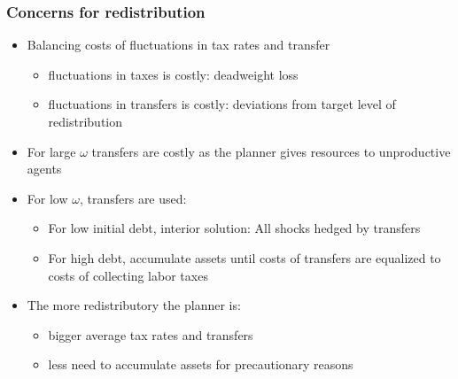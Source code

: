 \documentclass{beamer}
\begin{document}
\begin{frame}
\frametitle{Concerns for redistribution}

\begin{itemize}
\item Balancing costs of fluctuations in tax rates and transfer

\begin{itemize}
\item fluctuations in taxes is costly: deadweight loss

\item fluctuations in transfers is costly: deviations from target level of
redistribution
\end{itemize}

\item For large $\omega$ transfers are costly as the planner gives resources to unproductive agents 

\item For low $\omega$, transfers are used: 
\begin{itemize}
\item For low initial debt, interior solution: All shocks hedged by transfers
\item For high debt, accumulate assets until costs of transfers are equalized to costs of collecting labor taxes
\end{itemize}

\item The more redistributory the planner is:

\begin{itemize}
\item bigger average tax rates and transfers
\item less need to accumulate assets for precautionary reasons
\end{itemize}
\end{itemize}

\end{frame}
\end{document}
